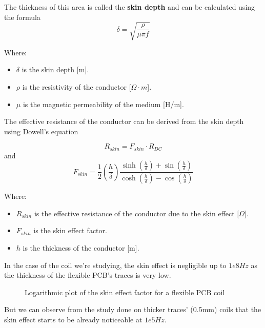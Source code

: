 \begin{itemize}
    The thickness of this area is called the \textbf{skin depth} and can be calculated using the formula
    \begin{equation}
        \delta = \sqrt{\frac{\rho}{\mu \pi f}}
    \end{equation}
            
    Where:
    \begin{itemize}
        \item \( \delta \) is the skin depth [m].
        \item \( \rho \) is the resistivity of the conductor [\(\Omega \cdot m\)].
        \item \( \mu \) is the magnetic permeability of the medium [H/m].
    \end{itemize}
    
    The effective resistance of the conductor can be derived from the skin depth using Dowell's equation

    \begin{equation}
        R_{skin} = F_{skin} \cdot R_{DC}
    \end{equation}
    and
    \begin{equation}
        F_{skin} = \frac{1}{2} (\frac{h}{\delta}) \frac{\sinh(\frac{h}{\delta}) + \sin(\frac{h}{\delta})}{\cosh(\frac{h}{\delta}) - \cos(\frac{h}{\delta})}
    \end{equation}

    Where:
    \begin{itemize}
        \item \( R_{skin} \) is the effective resistance of the conductor due to the skin effect [\(\Omega\)].
        \item \( F_{skin} \) is the skin effect factor.
        \item \( h \) is the thickness of the conductor [m].
    \end{itemize}

    In the case of the coil we're studying, the skin effect is negligible up to $1e8 Hz$ as the thickness of the flexible PCB's traces is very low.

    \begin{figure}
        \vfill
        
        \caption[Fskin of Flexar]{Logarithmic plot of the skin effect factor for a flexible PCB coil}
        \label{fig:Fskin of Flexar}
    \end{figure}

    But we can observe from the study done on thicker traces' (0.5mm) coils that the skin effect starts to be already noticeable at $1e5 Hz$.
    

\end{itemize}
